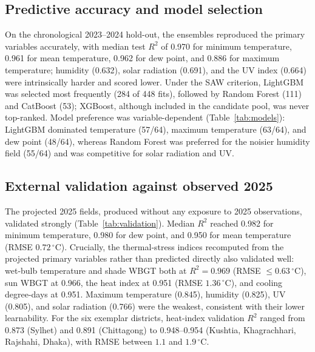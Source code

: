\documentclass[review,11pt]{elsarticle}
\newcommand{\degC}{\ensuremath{^{\circ}\mathrm{C}}}
\begin{document}
\subsection{Predictive accuracy and model selection}\label{sec:res-models}
On the chronological 2023--2024 hold-out, the ensembles reproduced the primary
variables accurately, with median test $R^{2}$ of 0.970 for minimum temperature,
0.961 for mean temperature, 0.962 for dew point, and 0.886 for maximum
temperature; humidity (0.632), solar radiation (0.691), and the UV index (0.664)
were intrinsically harder and scored lower. Under the SAW criterion, LightGBM was
selected most frequently (284 of 448 fits), followed by Random Forest (111) and
CatBoost (53); XGBoost, although included in the candidate pool, was never
top-ranked. Model preference was variable-dependent (Table~\ref{tab:models}):
LightGBM dominated temperature (57/64), maximum temperature (63/64), and dew
point (48/64), whereas Random Forest was preferred for the noisier humidity
field (55/64) and was competitive for solar radiation and UV.

\begin{table}[htbp]
\centering
\caption{Best-model selection frequency across the 64 districts, by variable
(SAW criterion). XGBoost was never selected and is omitted.}
\label{tab:models}

\end{table}

\subsection{External validation against observed 2025}\label{sec:res-val}
The projected 2025 fields, produced without any exposure to 2025 observations,
validated strongly (Table~\ref{tab:validation}). Median $R^{2}$ reached 0.982 for
minimum temperature, 0.980 for dew point, and 0.950 for mean temperature (RMSE
$0.72\,\degC$). Crucially, the thermal-stress indices recomputed from the
projected primary variables rather than predicted directly also validated well:
wet-bulb temperature and shade WBGT both at $R^{2}=0.969$ (RMSE $\le
0.63\,\degC$), sun WBGT at 0.966, the heat index at 0.951 (RMSE $1.36\,\degC$),
and cooling degree-days at 0.951. Maximum temperature (0.845), humidity (0.825),
UV (0.805), and solar radiation (0.766) were the weakest, consistent with their
lower learnability. For the six exemplar districts, heat-index validation $R^{2}$
ranged from 0.873 (Sylhet) and 0.891 (Chittagong) to 0.948--0.954 (Kushtia,
Khagrachhari, Rajshahi, Dhaka), with RMSE between $1.1$ and $1.9\,\degC$.
\end{document}
